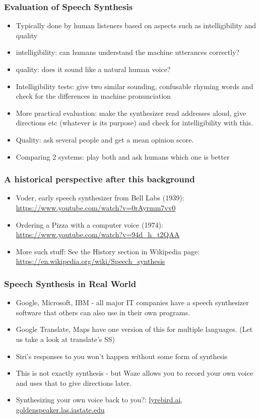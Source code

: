 \documentclass{beamer}
\begin{document}
\begin{frame}
\frametitle{Evaluation of Speech Synthesis}
\begin{itemize}
\item Typically done by human listeners based on aspects such as intelligibility and quality
\item intelligibility: can humans understand the machine utterances correctly?
\item quality: does it sound like a natural human voice? \pause
\item Intelligibility tests: give two similar sounding, confusable rhyming words and check for the differences in machine pronunciation
\item More practical evaluation: make the synthesizer read addresses aloud, give directions etc (whatever is its purpose) and check for intelligibility with this. \pause
\item Quality: ask several people and get a mean opinion score. \pause
\item Comparing 2 systems: play both and ask humans which one is better
\end{itemize}
\end{frame}

\begin{frame}
\frametitle{A historical perspective after this background}
\begin{itemize}
\item Voder, early speech synthesizer from Bell Labs (1939): \url{https://www.youtube.com/watch?v=0rAyrmm7vv0}
\item Ordering a Pizza with a computer voice (1974): \url{https://www.youtube.com/watch?v=94d_h_t2QAA}
\item More such stuff: See the History section in Wikipedia page: \url{https://en.wikipedia.org/wiki/Speech_synthesis}
\end{itemize}
\end{frame}


\begin{frame}
\frametitle{Speech Synthesis in Real World}
\begin{itemize}
\item Google, Microsoft, IBM - all major IT companies have a speech synthesizer software that others can also use in their own programs.
\item Google Translate, Maps have one version of this for multiple languages. (Let us take a look at translate's SS)
\item Siri's responses to you won't happen without some form of synthesis
\item This is not exactly synthesis - but Waze allows you to record your own voice and uses that to give directions later.
\item Synthesizing your own voice back to you?: \url{lyrebird.ai}, \url{goldenspeaker.las.iastate.edu}
\end{itemize}
\end{frame}
\end{document}
